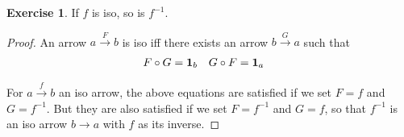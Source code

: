 \documentclass[11pt,a4paper,twoside]{article}
\newcommand{\aname}[1]{{\normalfont\textbf{#1}}}
\newcommand{\Id}{\aname{1}}
\theoremstyle{definition}
\newcounter{excounter}
\newtheorem{exercise}[excounter]{Exercise}
\begin{document}
\begin{exercise}

If $f$ is iso, so is $f^{-1}$.

\end{exercise}

\begin{proof}

  An arrow $a \xrightarrow{F} b$ is iso iff there exists an arrow $b \xrightarrow{G} a$ such that
  \begin{align}
    F \circ G = \Id_b &\quad G \circ F = \Id_a
  \end{align}

  For $a \xrightarrow{f} b$ an iso arrow, the above equations are satisfied if we set $F = f$ and $G = f^{-1}$. But they are also satisfied if we set $F = f^{-1}$ and $G = f$, so that $f^{-1}$ is an iso arrow $b \to a$ with $f$ as its inverse.

\end{proof}
\end{document}
